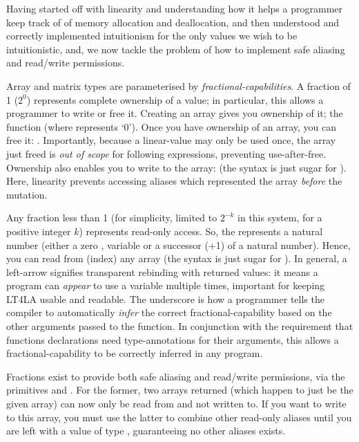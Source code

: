 Having started off with linearity and understanding how it helps a programmer
keep track of of memory allocation and deallocation, and then understood and
correctly implemented intuitionism for the only values we wish to be
intuitionistic, and, we now tackle the problem of how to implement safe
aliasing and read/write permissions.

Array and matrix types are parameterised by \emph{fractional-capabilities}.  A
fraction of 1 ($2^0$) represents complete ownership of a value; in particular,
this allows a programmer to write or free it. Creating an array gives you
ownership of it; the function  (where 
represents `0'). Once you have ownership of an array, you can free it:
.  Importantly, because a linear-value may only be
used once, the array just freed is \emph{out of scope} for following
expressions, preventing use-after-free.  Ownership also enables you to write to
the array:  (the syntax
 is just sugar for ). Here, linearity
prevents accessing aliases which represented the array \emph{before} the
mutation.

Any fraction less than 1 (for simplicity, limited to $2^{-k}$ in this system,
for a positive integer $k$) represents read-only access. So, the 
represents a natural number (either a zero , variable  or a
successor (+1) of a natural number). Hence, you can read from (index) any array
 (the syntax  is just sugar for ). In general, a
left-arrow \ltfla{<-} signifies transparent rebinding with returned values: it
means a program can \emph{appear} to use a variable multiple times, important
for keeping LT4LA usable and readable. The underscore is how a programmer tells
the compiler to automatically \emph{infer} the correct fractional-capability
based on the other arguments passed to the function. In conjunction with the
requirement that functions declarations need type-annotations for their
arguments, this allows a fractional-capability to be correctly inferred in any
program.

Fractions exist to provide both safe aliasing and read/write permissions, via
the primitives  and
.  For the former, two
arrays returned (which happen to just be the given array) can now only be read
from and not written to. If you want to write to this array, you must use the
latter to combine other read-only aliases until you are left with a value of
type , guaranteeing no other aliases exists.

